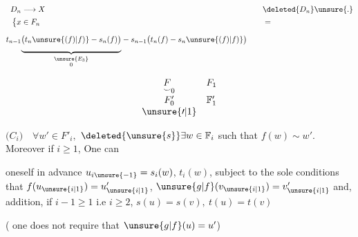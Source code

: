 

\[
\begin{aligned}
D_n&\longrightarrow X &\quad&\deleted{D_n}\unsure{.}\\
\bigl\{x&\in F_n && =\\
t_{n-1}{}&
\underset{\substack{\unsure{E_3}\hfill\\0}}{\underbrace{\vphantom{\bigg|}\bigl(t_n\unsure{(f)|f)}-s_n(f)\bigr)}}
-s_{n-1}\bigl(t_n(f)-s_n\unsure{(f)|f)}\bigr)&&
\end{aligned}
\]

\[
\begin{array}{cc}
\underset{\smile}{F}_0 & F_1\\[.6em]
F'_0 & \mathbb F'_1\\
\unsure{\prime|1}&
\end{array}
\]

\begin{flushright}
\begin{minipage}{.74\linewidth}
\(\bigl(C_i\bigr)\quad\forall w'\in F'_i,\)
 \(\deleted{\unsure{s}}\exists w\in\mathbb F_i\) such that
\(f(w)\sim w'\). Moreover if \(i\geq1\), One can
\par\noindent{}\begin{minipage}{.89\linewidth}
 oneself
in advance \(u_{i\unsure{-1}}=s_i(w)\), \(t_i(w)\),
 subject to the sole conditions  that
\(f(u_{\unsure{i|1}})=u'_{\unsure{i|1}}\), 
\(\unsure{g|f}(v_{\unsure{i|1}})=v'_{\unsure{i|1}}\)
and,  addition, if \(i-1\geq1\) i.e \(i\geq2\), 
\(s(u)=s(v),\ t(u)=t(v)\)
\end{minipage}

( one does not require that \(\unsure{g|f}(u)=u'\))
\end{minipage}
\end{flushright}

